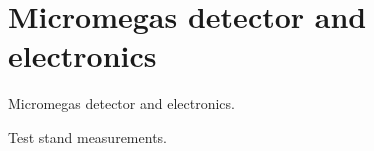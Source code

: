 \section{Micromegas detector and electronics}
\label{sec:experiment}

Micromegas detector and electronics.

Test stand measurements.


